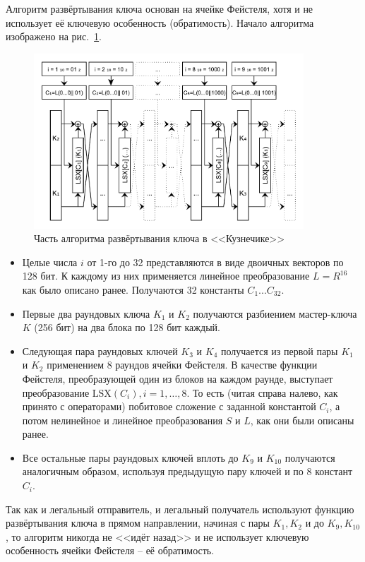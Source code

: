 Алгоритм развёртывания ключа основан на ячейке Фейстеля, хотя и не использует её ключевую особенность (обратимость). Начало алгоритма изображено на рис.~\ref{fig:kuznechik-keys}.

\begin{figure}[htb]
	\centering
	\includegraphics[width=0.90\textwidth]{pic/kuznechik-keys}
  \caption{Часть алгоритма развёртывания ключа в <<Кузнечике>>}
  \label{fig:kuznechik-keys}
\end{figure}

\begin{itemize}
	\item Целые числа $i$ от 1-го до 32 представляются в виде двоичных векторов по 128 бит. К каждому из них применяется линейное преобразование $L=R^{16}$ как было описано ранее. Получаются 32 константы $C_{1}...C_{32}$.
	\item Первые два раундовых ключа $K_1$ и $K_2$ получаются разбиением мастер-ключа $K$ (256 бит) на два блока по 128 бит каждый.
	\item Следующая пара раундовых ключей $K_3$ и $K_4$ получается из первой пары $K_1$ и $K_2$ применением 8 раундов ячейки Фейстеля. В качестве функции Фейстеля, преобразующей один из блоков на каждом раунде, выступает преобразование $\text{LSX}(C_i), i=1,\dots,8$. То есть (читая справа налево, как принято с операторами) побитовое сложение с заданной константой $C_i$, а потом нелинейное и линейное преобразования $S$ и $L$, как они были описаны ранее.
	\item Все остальные пары раундовых ключей вплоть до $K_{9}$ и $K_{10}$ получаются аналогичным образом, используя предыдущую пару ключей и по 8 констант $C_i$.
\end{itemize}

Так как и легальный отправитель, и легальный получатель используют функцию развёртывания ключа в прямом направлении, начиная с пары $K_1, K_2$ и до $K_{9}, K_{10}$, то алгоритм никогда не <<идёт назад>> и не использует ключевую особенность ячейки Фейстеля -- её обратимость.

